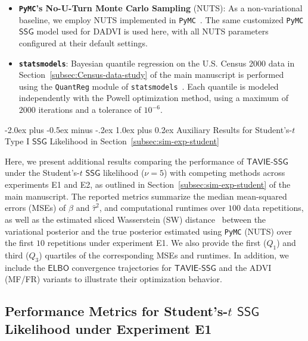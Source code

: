 \documentclass[12pt]{article}
\makeatletter
\def\section{\@startsection{section}{1}{\z@}
  {-2.0ex plus -0.5ex minus -.2ex} %
  {1.0ex plus 0.2ex}               %
  {\normalfont\Large\bfseries}}
\numberwithin{equation}{section}
\newcommand{\ssg}{\mathsf{SSG}}
\newcommand{\tssg}{\mathsf{TAVIE}\text{-}\mathsf{SSG}}
\makeatother
\begin{document}
\begin{itemize}
    \item \textbf{\texttt{PyMC}'s No-U-Turn Monte Carlo Sampling} (NUTS): As a non-variational baseline, we employ NUTS implemented in \texttt{PyMC}~\citep{pymc,pymc2023peerj}. The same customized \texttt{PyMC} $\mathsf{SSG}$ model used for DADVI is used here, with all NUTS parameters configured at their default settings.

    \item \textbf{\texttt{statsmodels}}: Bayesian quantile regression on the U.S. Census 2000 data in Section~\ref{subsec:Census-data-study} of the main manuscript is performed using the \texttt{QuantReg} module of \texttt{statsmodels}~\citep{seabold2010statsmodels}. Each quantile is modeled independently with the Powell optimization method, using a maximum of $2000$ iterations and a tolerance of $10^{-6}$.
\end{itemize}

\newpage

\section{Auxiliary Results for \texorpdfstring{Student's-$t$}{Student's-t} Type I \texorpdfstring{$\mathsf{SSG}$}{SSG} Likelihood in \texorpdfstring{Section~\ref{subsec:sim-exp-student}}{Section 4.1}}\label{app:additional-student-results}

Here, we present additional results comparing the performance of $\tssg$ under the Student’s-$t$ $\ssg$ likelihood ($\nu=5$) with competing methods across experiments E1 and E2, as outlined in Section~\ref{subsec:sim-exp-student} of the main manuscript. The reported metrics summarize the median mean-squared errors (MSEs) of $\widehat{\beta}$ and $\widehat{\tau}^{2}$, and computational runtimes over $100$ data repetitions, as well as the estimated sliced Wasserstein (SW) distance~\citep{bonneel2015sliced,kolouri2016sliced} between the variational posterior and the true posterior estimated using \texttt{PyMC} (NUTS) over the first $10$ repetitions under experiment E1. We also provide the first ($Q_1$) and third ($Q_3$) quartiles of the corresponding MSEs and runtimes. In addition, we include the $\mathsf{ELBO}$ convergence trajectories for $\tssg$ and the ADVI (MF/FR) variants to illustrate their optimization behavior.

\subsection{Performance Metrics for \texorpdfstring{Student's-$t$ $\mathsf{SSG}$}{Student's-t SSG} Likelihood under Experiment E1}\label{app-avg-metrics-student-singlep-multin}
\end{document}
